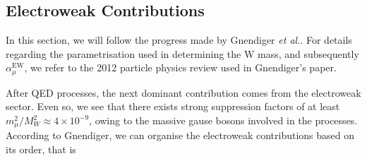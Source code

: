 \documentclass{article}
\numberwithin{equation}{section} %
\begin{document}
%
%
%
%
%



\subsection{Electroweak Contributions}

In this section, we will follow the progress made by Gnendiger \textit{et al.}\cite{gnendiger}. For details regarding the parametrisation used in determining the W mass, and subsequently $\alpha_\mu^\mathrm{EW}$, we refer to the 2012 particle physics review\cite{particle_review} used in Gnendiger's paper.

After QED processes, the next dominant contribution comes from the electroweak sector. Even so, we see that there exists strong suppression factors of at least $m_\mu^2/ M_W^2\approx 4\times 10^{-9}$\cite{hoecker}, owing to the massive gause bosons involved in the processes. According to Gnendiger\cite{gnendiger}, we can organise the electroweak contributions based on its order, that is
\end{document}
